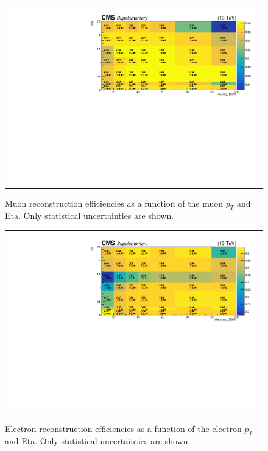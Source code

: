 \begin{figure}[hptb]
\begin{center}
\begin{tabular}{c}
\includegraphics[width=1.0\textwidth]{sections/mc4/Backgrounds/LostLepton/figures/v3_2d_effs_mus_reco_no_baseline.pdf}
\end{tabular}
\end{center}
\caption{Muon reconstruction efficiencies as a function of the muon $p_T$ and Eta. Only statistical uncertainties are shown.}
\label{fig:muoneffreco}
\end{figure}

\begin{figure}[hptb]
\begin{center}
\begin{tabular}{c}
\includegraphics[width=1.0\textwidth]{sections/mc4/Backgrounds/LostLepton/figures/v3_2d_effs_els_reco_no_baseline.pdf}
\end{tabular}
\end{center}
\caption{Electron reconstruction efficiencies as a function of the electron $p_T$ and Eta. Only statistical uncertainties
are shown.}
\label{fig:eleeffreco}
\end{figure}

